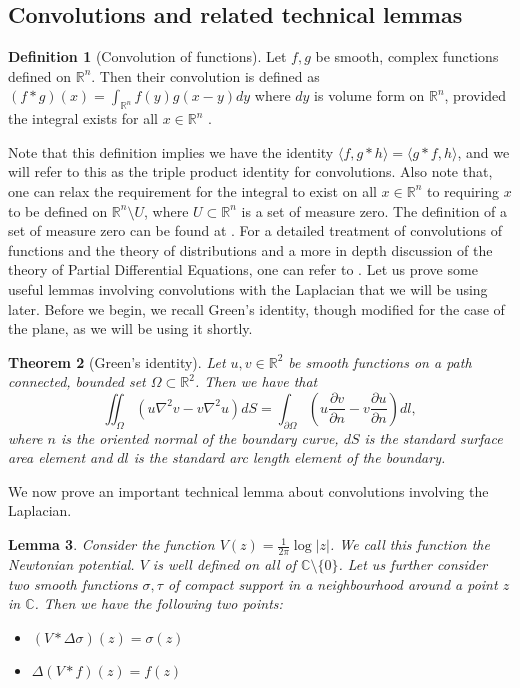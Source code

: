 \documentclass[11pt]{report}
\newtheorem{thm}{Theorem}[section]
\newtheorem{lemma}[thm]{Lemma}
\theoremstyle{definition}
\newtheorem{defn}[thm]{Definition}
\begin{document}
\subsection{Convolutions and related technical lemmas}
\begin{defn}[Convolution of functions]\label{ConvolutionDefn}
  Let $f,g$ be smooth, complex functions defined on $\mathbb{R}^n$. Then their convolution is defined as $(f * g)(x) = \int_{\mathbb{R}^n}f(y)g(x-y)dy$ where $dy$ is volume form on $\mathbb{R}^n$, provided the integral exists for all $x \in \mathbb{R}^n$ .
\end{defn}
Note that this definition implies we have the identity $\langle f, g*h \rangle = \langle g*f, h \rangle$, and we will refer to this as the triple product identity for convolutions. Also note that, one can relax the requirement for the integral to exist on all $x \in \mathbb{R}^n$ to requiring $x$ to be defined on $\mathbb{R}^n\setminus{U}$, where $U \subset \mathbb{R}^n$ is a set of measure zero. The definition of a set of measure zero can be found at \cite[p.50]{spivak}.
For a detailed treatment of convolutions of functions and the theory of distributions and a more in depth discussion of the theory of Partial Differential Equations, one can refer to \cite[(Chapter 6)]{rudin}. 
Let us prove some useful lemmas involving convolutions with the Laplacian that we will be using later. Before we begin, we recall Green's identity, though modified for the case of the plane, as we will be using it shortly. 
\begin{thm}[Green's identity]
  Let $u,v \in \mathbb{R}^2$ be smooth functions on a path connected, bounded set $\Omega \subset \mathbb{R}^2$. Then we have that  
  \[\iint_{\Omega} (u \nabla^2 v - v \nabla^2 u) dS= \int_{\partial \Omega} \left(u \frac{\partial v}{\partial n} - v \frac{\partial u}{\partial n}\right) dl, \] 
  where $n$ is the oriented normal of the boundary curve, $dS$ is the standard surface area element and $dl$ is the standard arc length element of the boundary.
\end{thm}

We now prove an important technical lemma about convolutions involving the Laplacian.
\begin{lemma}\label{ConvProperties}
  Consider the function $V(z) = \frac{1}{2\pi}\log|z|$. We call this function the Newtonian potential. $V$ is well defined on all of $\mathbb{C}\setminus\{0\}$. Let us further consider two smooth functions $\sigma, \tau$ of compact support in a neighbourhood around a point $z$ in $\mathbb{C}$. Then we have the following two points:
  \begin{itemize}
    \item $(V * \Delta \sigma)(z)=\sigma(z)$
    \item $\Delta(V * f)(z) = f(z)$
  \end{itemize}
\end{lemma}
\end{document}
